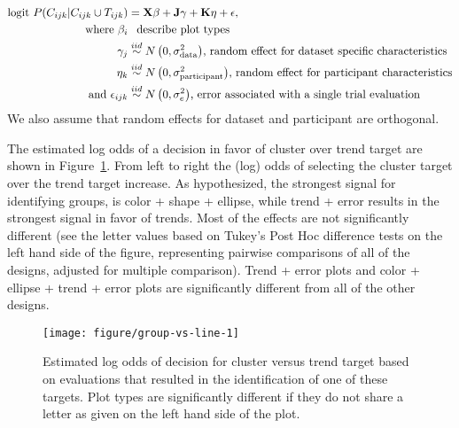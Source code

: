 \documentclass[12pt]{article}\usepackage[]{graphicx}\usepackage[]{color}
\newenvironment{knitrout}{}{} %
\begin{document}
\begin{align}
\text{logit }P(C_{ijk} | C_{ijk}\cup T_{ijk}) & =  \textbf{X}\beta + \textbf{J}\gamma + \textbf{K}\eta + \epsilon, \label{eqn:faceoffModel}\\
\text{where } \beta_i & \hphantom{\sim} \text{describe plot types}\nonumber\\
\hphantom{where } \gamma_j & \overset{iid}{\sim} N\left(0, \sigma^2_{\text{data}}\right)\!\text{,  random effect for dataset specific characteristics}\nonumber\\
\hphantom{where } \eta_k & \overset{iid}{\sim} N\left(0, \sigma^2_{\text{participant}}\right)\!\text{, random effect for participant characteristics}\nonumber\\
\text{and } \epsilon_{ijk} & \overset{iid}{\sim}  N\left(0, \sigma^2_e\right)\!\text{, error associated with a single trial evaluation} \nonumber\end{align}
We also assume that random effects for dataset and participant are orthogonal. 

The estimated log odds of a decision in favor of cluster over trend target are shown in Figure~\ref{fig:faceoff}. From left to right the (log) odds of selecting the cluster target over the trend target increase. As hypothesized, the strongest signal for identifying groups, is color + shape + ellipse, while trend + error results in the strongest signal in favor of trends. Most of the effects are not significantly different (see the letter values \cite{piepho:04} based on Tukey's Post Hoc difference tests on the left hand side of the figure, representing pairwise comparisons of all of the designs, adjusted for multiple comparison). Trend + error plots and color + ellipse + trend + error plots are significantly different from all of the other designs. 


\begin{figure}[ht]\centering
\begin{knitrout}
\color{fgcolor}

{\centering \texttt{[image: figure/group-vs-line-1]} 

}



\end{knitrout}
\caption[Estimated log odds of decision for cluster versus trend target]{\label{fig:faceoff} Estimated log odds of decision for cluster versus trend target based on evaluations that resulted in the identification of one of these targets. Plot types are significantly different if they do not share a letter as given on the left hand side of the plot.}
\end{figure}
\end{document}
